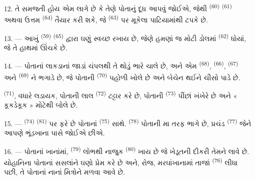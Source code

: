 12. તે સમજતી હોય એમ લાગે છે કે તેણે પોતાનું દૂધ આપવું જોઈએ, જેથી
 \textsuperscript{(60)} 
\textsuperscript{(61)}  અથવા ઉત્તમ 
\textsuperscript{(64)} તૈયાર કરી શકે, જે 
\textsuperscript{(63)} પર મૂકેલા પાટિયામાંથી ટપકે છે.

13. --- આખું  \textsuperscript{(59)}  \textsuperscript{(65)} દ્વારા ઘણું સ્વચ્છ રખાય છે, જેણે હમણાં જ
મોટી ડોલમાં  \textsuperscript{(62)} ધોયાં, જે તે
હાથમાં ઊંચકે છે.

\VUsaut{3.0mm}
\VUsaut{3.0mm}

14. --- પોતાનાં લાકડાનાં જાડાં ચંપલથી તે થોડું ભારે ચાલે છે, અને એમ
 \textsuperscript{(68)}, 
\textsuperscript{(66)},  \textsuperscript{(67)} અને
 \textsuperscript{(69)} ને ભગાડે છે, જે પોતાની
 \textsuperscript{(70)} પહોળી ખોલે છે અને બેચેન થઈને
ચીસો પાડે છે.

 \textsuperscript{(71)}, વધારે લડાયક, પોતાની લાલ
 \textsuperscript{(72)} ટટ્ટાર કરે છે, પોતાની
 \textsuperscript{(73)} પીંછાં ખંખેરે છે અને
« કૂકડેકૂક » મોટેથી બોલે છે.

15. ---  \textsuperscript{(74)} 
\textsuperscript{(81)} પર ફરે છે પોતાનાં 
\textsuperscript{(75)} સાથે. 
\textsuperscript{(78)} પોતાની મા તરફ ભાગે છે, પ્રચંડ 
\textsuperscript{(77)} જેને આપણે ભૂંડખાના પાસે જોઈએ છીએ.

16. --- પોતાનાં ખાનાંમાં,  \textsuperscript{(79)}
લોભથી નાજુક  \textsuperscript{(80)} ખાય છે જે ખેડૂતની દીકરી
તેમને લાવે છે. યોહાનિના પોતાનાં સસલાંને ઘણો પ્રેમ કરે છે અને, રોજ,
મરઘાંખાનામાં તાજાં  \textsuperscript{(76)} લીધા પછી, તે
પોતાનાં નાનાં મિત્રોને મળવા આવે છે.

\VUsaut{6.0mm}
\VUfilet{22mm}
